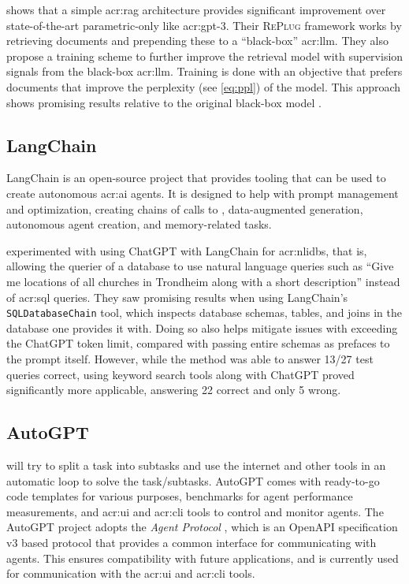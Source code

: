 \cite{shiREPLUGRetrievalAugmentedBlackBox2023} shows that a simple \gls{acr:rag} architecture provides significant improvement over state-of-the-art parametric-only  like \acrshort{acr:gpt}-3. Their \textsc{RePlug} framework works by retrieving documents and prepending these to a \enquote{black-box} \acrshort{acr:llm}. They also propose a training scheme to further improve the retrieval model with supervision signals from the black-box \acrshort{acr:llm}. Training is done with an objective that prefers documents that improve the perplexity (see \eqref{eq:ppl}) of the model. This approach shows promising results relative to the original black-box model \citep[5-6]{shiREPLUGRetrievalAugmentedBlackBox2023}.

\subsection{LangChain}\label{subsubsec:langchain}

LangChain \citep{chaseLangChain2022} is an open-source project that provides tooling that can be used to create autonomous \acrshort{acr:ai} agents. It is designed to help with prompt management and optimization, creating chains of calls to , data-augmented generation, autonomous agent creation, and memory-related tasks.

\cite{nascimentoFamilyNaturalLanguage2023} experimented with using ChatGPT with LangChain for \glspl{acr:nlidb}, that is, allowing the querier of a database to use natural language queries such as \enquote{Give me locations of all churches in Trondheim along with a short description} instead of \acrshort{acr:sql} queries. They saw promising results when using LangChain's \texttt{SQLDatabaseChain} tool, which inspects database schemas, tables, and joins in the database one provides it with. Doing so also helps mitigate issues with exceeding the ChatGPT token limit, compared with passing entire schemas as prefaces to the prompt itself. However, while the method was able to answer 13/27 test queries correct, using keyword search tools along with ChatGPT proved significantly more applicable, answering 22 correct and only 5 wrong.

\subsection{AutoGPT}\label{subsubsec:autogpt}

\cite{richardAutoGPTHeartOpensource2023} will try to split a task into subtasks and use the internet and other tools in an automatic loop to solve the task/subtasks. AutoGPT comes with ready-to-go code templates for various purposes, benchmarks for agent performance measurements, and \acrshort{acr:ui} and \acrshort{acr:cli} tools to control and monitor agents. The AutoGPT project adopts the  \textit{Agent Protocol} \cite{AgentProtocol}, which is an OpenAPI specification v3 based protocol that provides a common interface for communicating with agents. This ensures compatibility with future applications, and is currently used for communication with the \acrshort{acr:ui} and \acrshort{acr:cli} tools.

